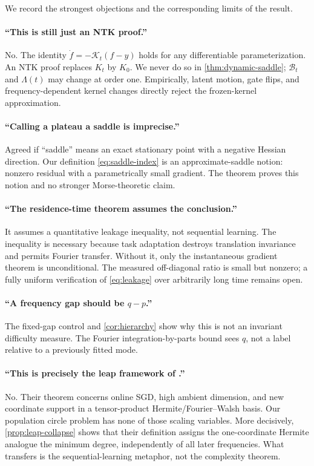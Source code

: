 \documentclass[11pt]{article}
\newcommand{\1}{\mathbf 1}
\newcommand{\cB}{\mathcal B}
\theoremstyle{plain}
\theoremstyle{definition}
\begin{document}
We record the strongest objections and the corresponding limits of the
result.

\paragraph{``This is still just an NTK proof.''}
No.  The identity \(\dot f=-\mathcal K_t(f-y)\) holds for any differentiable
parameterization.  An NTK proof replaces \(K_t\) by \(K_0\).  We never do so
in \cref{thm:dynamic-saddle}; \(\cB_t\) and \(\Lambda(t)\) may change at
order one.  Empirically, latent motion, gate flips, and frequency-dependent
kernel changes directly reject the frozen-kernel approximation.

\paragraph{``Calling a plateau a saddle is imprecise.''}
Agreed if ``saddle'' means an exact stationary point with a negative Hessian
direction.  Our definition \eqref{eq:saddle-index} is an approximate-saddle
notion: nonzero residual with a parametrically small gradient.  The theorem
proves this notion and no stronger Morse-theoretic claim.

\paragraph{``The residence-time theorem assumes the conclusion.''}
It assumes a quantitative leakage inequality, not sequential learning.  The
inequality is necessary because task adaptation destroys translation
invariance and permits Fourier transfer.  Without it, only the instantaneous
gradient theorem is unconditional.  The measured off-diagonal ratio is
small but nonzero; a fully uniform verification of \eqref{eq:leakage} over
arbitrarily long time remains open.

\paragraph{``A frequency gap should be \(q-p\).''}
The fixed-gap control and \cref{cor:hierarchy} show why this is not an
invariant difficulty measure.  The Fourier integration-by-parts bound sees
\(q\), not a label relative to a previously fitted mode.

\paragraph{``This is precisely the leap framework of
\citet{abbe2023leap}.''}
No.  Their theorem concerns online SGD, high ambient dimension, and new
coordinate support in a tensor-product Hermite/Fourier--Walsh basis.  Our
population circle problem has none of those scaling variables.  More
decisively, \cref{prop:leap-collapse} shows that their definition assigns
the one-coordinate Hermite analogue the minimum degree, independently of
all later frequencies.  What transfers is the sequential-learning metaphor,
not the complexity theorem.
\end{document}
